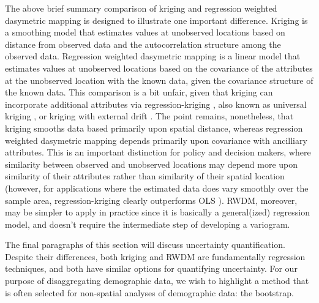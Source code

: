 \documentclass[draft]{article}
\begin{document}
The above brief summary comparison of kriging and regression weighted dasymetric mapping is designed to illustrate one important difference.  Kriging is a smoothing model that estimates values at unobserved locations based on distance from observed data and the autocorrelation structure among the observed data.  Regression weighted dasymetric mapping is a linear model that estimates values at unobserved locations based on the covariance of the attributes at the unobserved location with the known data, given the covariance structure of the known data.  This comparison is a bit unfair, given that kriging can incorporate additional attributes via regression-kriging \cite{hengl07}, also known as universal kriging \cite{wackernagel03}, or kriging with external drift \cite{bourennane00, hudson94}.  The point remains, nonetheless, that kriging smooths data based primarily upon spatial distance, whereas regression weighted dasymetric mapping depends primarily upon covariance with ancilliary attributes.  This is an important distinction for policy and decision makers, where similarity between observed and unobserved locations may depend more upon similarity of their attributes rather than similarity of their spatial location (however, for applications where the estimated data does vary smoothly over the sample area, regression-kriging clearly outperforms OLS \cite{bourennane00}).  RWDM, moreover, may be simpler to apply in practice since it is basically a general(ized) regression model, and doesn't require the intermediate step of developing a variogram.


The final paragraphs of this section will discuss uncertainty quantification.
Despite their differences, both kriging and RWDM are fundamentally regression techniques, and both have similar options for %
quantifying uncertainty.  For our purpose of disaggregating demographic data, we wish to highlight a method that is often selected for non-spatial analyses of demographic data: the bootstrap.%
\end{document}
